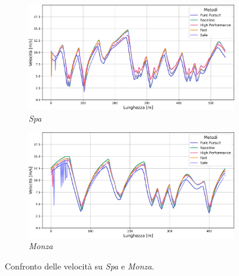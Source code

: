 \begin{figure}[H]
    \centering
    \begin{subfigure}{\textwidth}
        \centering
        \includegraphics[scale=0.4]{images/spa_mpc_speed_comparisons.png} 
        \caption{\textit{Spa}}
        \label{fig:speed_comp_spa}
    \end{subfigure}
    \begin{subfigure}{\textwidth}
        \centering
        \includegraphics[scale=0.4]{images/monza_mpc_speed_comparisons.png}
        \caption{\textit{Monza}}
        \label{fig:speed_comp_monza}
    \end{subfigure}
    \caption{Confronto delle velocità su \textit{Spa} e \textit{Monza}.}
    \label{fig:fig20} %
\end{figure}

